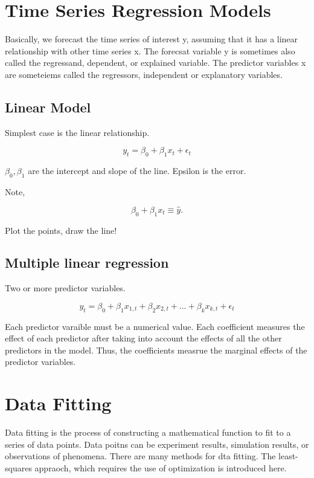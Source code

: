 \documentclass[12pt, a4paper]{report}
\begin{document}
  \section{Time Series Regression Models}

  Basically, we forecast the time series of interest y, assuming that it has a linear relationship with other time series x. The forecsat variable y is sometimes also called the regressand, dependent, or explained variable. The predictor variables x are someteiems called the regressors, independent or explanatory variables.

  \subsection{Linear Model}

  Simplest case is the linear relationship.

  \begin{equation}
    y_t = \beta_0 + \beta_1 x_t + \epsilon_t
  \end{equation}

  $ \beta_0, \beta_1 $ are the intercept and slope of the line. Epsilon is the error.

  Note,

  \[
      \beta_0 + \beta_1 x_t \equiv \hat y
    .\]

  Plot the points, draw the line!

  \subsection{Multiple linear regression}

  Two or more predictor variables.

  \begin{equation}
    y_t = \beta_0 + \beta_1 x_{1,t} + \beta_2 x_{2,t} + \ldots + \beta_k  x_{k,t} + \epsilon_t
  \end{equation}

  Each predictor varaible must be a numerical value. Each coefficient measures the effect of each predictor after taking into account the effects of all the other predictors in the model. Thus, the coefficients measrue the marginal effects of the predictor variables.

  \section{Data Fitting}

  Data fitting is the process of constructing a mathematical function to fit to a series of data points. Data poitns can be experiment results, simulation results, or observations of phenomena. There are many methods for dta fitting. The least-squares appraoch, which requires the use of optimization is introduced here.
\end{document}
